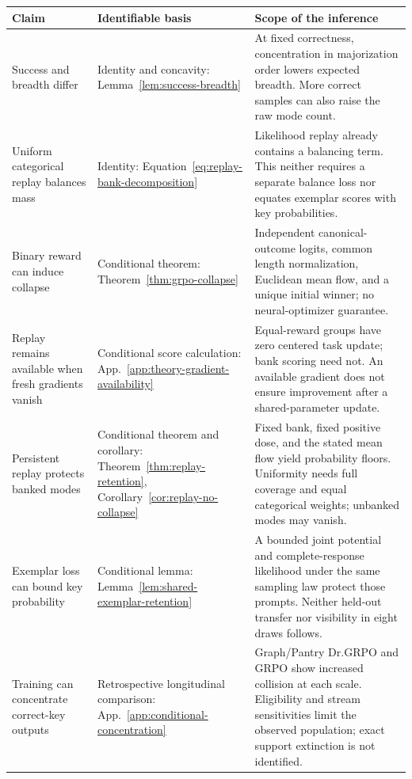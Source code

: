 \documentclass{article}
\newcommand{\1}{\mathbf 1}
\theoremstyle{remark}
\theoremstyle{definition}
\theoremstyle{plain}
\begin{document}
\begin{table}[H]
\centering
\small
\setlength{\tabcolsep}{5pt}
\renewcommand{\arraystretch}{1.16}
\begin{tabularx}{\linewidth}{@{}p{.21\linewidth}p{.22\linewidth}X@{}}
\toprule
\textbf{Claim} & \textbf{Identifiable basis} & \textbf{Scope of the inference} \\
\midrule
Success and breadth differ & Identity and concavity: Lemma~\ref{lem:success-breadth} &
At fixed correctness, concentration in majorization order lowers expected breadth.
More correct samples can also raise the raw mode count. \\
Uniform categorical replay balances mass & Identity: Equation~\eqref{eq:replay-bank-decomposition} &
Likelihood replay already contains a balancing term. This neither requires a
separate balance loss nor equates exemplar scores with key probabilities. \\
Binary reward can induce collapse & Conditional theorem: Theorem~\ref{thm:grpo-collapse} &
Independent canonical-outcome logits, common length normalization, Euclidean
mean flow, and a unique initial winner; no neural-optimizer guarantee. \\
Replay remains available when fresh gradients vanish & Conditional score calculation:
App.~\ref{app:theory-gradient-availability} &
Equal-reward groups have zero centered task update; bank scoring need not.
An available gradient does not ensure improvement after a shared-parameter update. \\
Persistent replay protects banked modes & Conditional theorem and corollary:
Theorem~\ref{thm:replay-retention}, Corollary~\ref{cor:replay-no-collapse} &
Fixed bank, fixed positive dose, and the stated mean flow yield probability
floors. Uniformity needs full coverage and equal categorical weights;
unbanked modes may vanish. \\
Exemplar loss can bound key probability & Conditional lemma:
Lemma~\ref{lem:shared-exemplar-retention} &
A bounded joint potential and complete-response likelihood under the same
sampling law protect those prompts. Neither held-out transfer nor visibility
in eight draws follows. \\
Training can concentrate correct-key outputs & Retrospective longitudinal comparison:
App.~\ref{app:conditional-concentration} &
Graph/Pantry Dr.GRPO and GRPO show increased collision at each scale.
Eligibility and stream sensitivities limit the observed population; exact
support extinction is not identified. \\

\end{tabularx}
\end{table}
\end{document}

